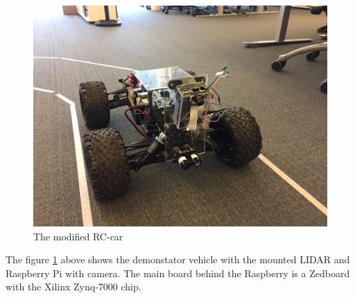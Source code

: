 \begin{figure}[H]
  \includegraphics[width=\textwidth]{./img/utor.JPG}
  \centering
  \caption{The modified RC-car}
  \label{fig:The modified RC-car used for demonstrator}
\end{figure}

The figure \ref{fig:The modified RC-car used for demonstrator} above shows the demonstator vehicle with the mounted LIDAR and Raspberry Pi with camera. The main board behind the Raspberry is a Zedboard with the Xilinx Zynq-7000 chip.\\


